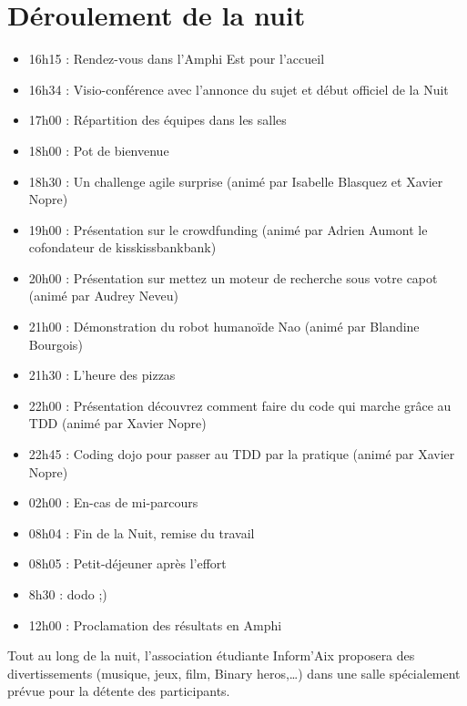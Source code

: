 \documentclass[a4paper,11pt]{article}
\begin{document}
\section{Déroulement de la nuit}
\begin{itemize}
   	\item 16h15 : Rendez-vous dans l’Amphi Est pour l’accueil
    \item 16h34 : Visio-conférence avec l'annonce du sujet et début officiel de la Nuit
   	\item 17h00 : Répartition des équipes dans les salles
   	\item 18h00 : Pot de bienvenue
   	\item 18h30 : Un challenge agile surprise (animé par Isabelle Blasquez et Xavier Nopre)
   	\item 19h00 : Présentation sur le crowdfunding (animé par Adrien Aumont le cofondateur de kisskissbankbank)
   	\item 20h00 : Présentation sur mettez un moteur de recherche sous votre capot (animé par Audrey Neveu)
   	\item 21h00 : Démonstration du robot humanoïde Nao (animé par Blandine Bourgois)
   	\item 21h30 : L'heure des pizzas
   	\item 22h00 : Présentation découvrez comment faire du code qui marche grâce au TDD (animé par Xavier Nopre)
   	\item 22h45 : Coding dojo pour passer au TDD par la pratique (animé par Xavier Nopre)
   	\item 02h00 : En-cas de mi-parcours
   	\item 08h04 : Fin de la Nuit, remise du travail
   	\item 08h05 : Petit-déjeuner après l'effort
   	\item 8h30  : dodo ;)
   	\item 12h00 : Proclamation des résultats en Amphi
\end{itemize}
Tout au long de la nuit, l’association étudiante Inform'Aix proposera des divertissements (musique, jeux, film, Binary heros,…) dans une salle spécialement prévue pour la détente des participants.
\end{document}
